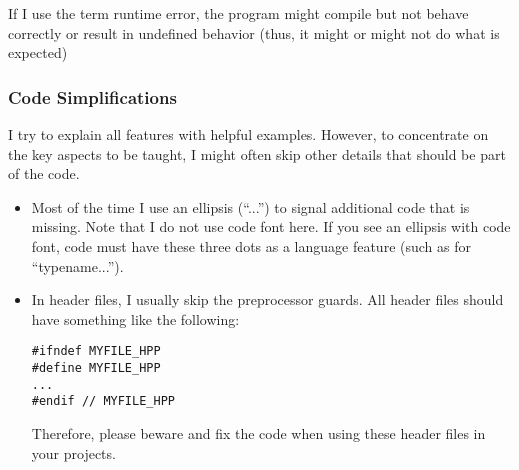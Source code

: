 If I use the term runtime error, the program might compile but not behave correctly or result in undefined behavior (thus, it might or might not do what is expected)

\subsubsection*{ Code Simplifications}

I try to explain all features with helpful examples. However, to concentrate on the key aspects to be taught, I might often skip other details that should be part of the code.

\begin{itemize}
\item
Most of the time I use an ellipsis (“...”) to signal additional code that is missing. Note that I do not use code font here. If you see an ellipsis with code font, code must have these three dots as a language feature (such as for “typename...”).

\item
In header files, I usually skip the preprocessor guards. All header files should have something like the following:

\begin{lstlisting}[style=styleCXX]
#ifndef MYFILE_HPP
#define MYFILE_HPP
...
#endif // MYFILE_HPP
\end{lstlisting}

Therefore, please beware and fix the code when using these header files in your projects.
\end{itemize}
